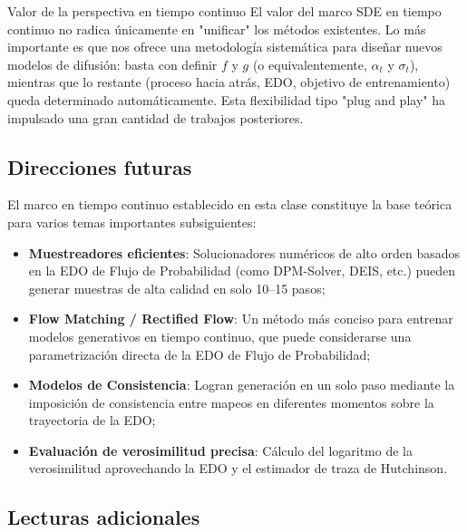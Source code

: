\begin{importantbox}{Valor de la perspectiva en tiempo continuo}
El valor del marco SDE en tiempo continuo no radica únicamente en "unificar" los métodos existentes. Lo más importante es que nos ofrece una metodología sistemática para diseñar nuevos modelos de difusión: basta con definir $f$ y $g$ (o equivalentemente, $\alpha_t$ y $\sigma_t$), mientras que lo restante (proceso hacia atrás, EDO, objetivo de entrenamiento) queda determinado automáticamente. Esta flexibilidad tipo "plug and play" ha impulsado una gran cantidad de trabajos posteriores.
\end{importantbox}

\subsection{Direcciones futuras}

El marco en tiempo continuo establecido en esta clase constituye la base teórica para varios temas importantes subsiguientes:

\begin{itemize}
    \item \textbf{Muestreadores eficientes}: Solucionadores numéricos de alto orden basados en la EDO de Flujo de Probabilidad (como DPM-Solver, DEIS, etc.) pueden generar muestras de alta calidad en solo 10--15 pasos;
    \item \textbf{Flow Matching / Rectified Flow}: Un método más conciso para entrenar modelos generativos en tiempo continuo, que puede considerarse una parametrización directa de la EDO de Flujo de Probabilidad;
    \item \textbf{Modelos de Consistencia}: Logran generación en un solo paso mediante la imposición de consistencia entre mapeos en diferentes momentos sobre la trayectoria de la EDO;
    \item \textbf{Evaluación de verosimilitud precisa}: Cálculo del logaritmo de la verosimilitud aprovechando la EDO y el estimador de traza de Hutchinson.
\end{itemize}

\subsection{Lecturas adicionales}

